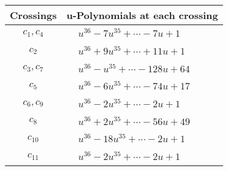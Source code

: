 \documentclass[1p]{elsarticle_modified}
\theoremstyle{definition}
\begin{document}
\begin{tabular}{m{50pt}|m{274pt}}
Crossings & \hspace{64pt}u-Polynomials at each crossing \\
\hline $$\begin{aligned}c_{1},c_{4}\end{aligned}$$&$\begin{aligned}
&u^{36}-7 u^{35}+\cdots-7 u+1
\end{aligned}$\\
\hline $$\begin{aligned}c_{2}\end{aligned}$$&$\begin{aligned}
&u^{36}+9 u^{35}+\cdots+11 u+1
\end{aligned}$\\
\hline $$\begin{aligned}c_{3},c_{7}\end{aligned}$$&$\begin{aligned}
&u^{36}- u^{35}+\cdots-128 u+64
\end{aligned}$\\
\hline $$\begin{aligned}c_{5}\end{aligned}$$&$\begin{aligned}
&u^{36}-6 u^{35}+\cdots-74 u+17
\end{aligned}$\\
\hline $$\begin{aligned}c_{6},c_{9}\end{aligned}$$&$\begin{aligned}
&u^{36}-2 u^{35}+\cdots-2 u+1
\end{aligned}$\\
\hline $$\begin{aligned}c_{8}\end{aligned}$$&$\begin{aligned}
&u^{36}+2 u^{35}+\cdots-56 u+49
\end{aligned}$\\
\hline $$\begin{aligned}c_{10}\end{aligned}$$&$\begin{aligned}
&u^{36}-18 u^{35}+\cdots-2 u+1
\end{aligned}$\\
\hline $$\begin{aligned}c_{11}\end{aligned}$$&$\begin{aligned}
&u^{36}-2 u^{35}+\cdots-2 u+1
\end{aligned}$\\
\hline
\end{tabular}\\~\\
\end{document}
